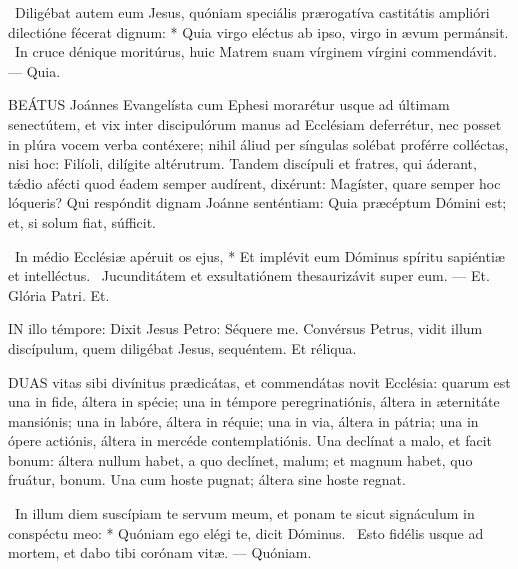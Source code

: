 \R\ Diligébat autem eum Jesus, quóniam speciális prærogatíva castitátis amplióri dilectióne fécerat dignum: * Quia virgo eléctus ab ipso, virgo in ævum permánsit. \V\ In cruce dénique moritúrus, huic Matrem suam vírginem vírgini commendávit. --- Quia.



\lettrine[lines=2]{B}{EÁTUS} Joánnes Evangelísta cum Ephesi morarétur usque ad últimam senectútem, et vix inter discipulórum manus ad Ecclésiam deferrétur, nec posset in plúra vocem verba contéxere; nihil áliud per síngulas solébat proférre colléctas, nisi hoc: Filíoli, dilígite altérutrum. Tandem discípuli et fratres, qui áderant, tǽdio afécti quod éadem semper audírent, dixérunt: Magíster, quare semper hoc lóqueris? Qui respóndit dignam Joánne senténtiam: Quia præcéptum Dómini est; et, si solum fiat, súfficit.

\R\ In médio Ecclésiæ apéruit os ejus, * Et implévit eum Dóminus spíritu sapiéntiæ et intelléctus. \V\ Jucunditátem et exsultatiónem thesaurizávit super eum. --- Et. Glória Patri. Et.




\lettrine[lines=2]{I}{N} illo témpore: Dixit Jesus Petro: Séquere me. Convérsus Petrus, vidit illum discípulum, quem diligébat Jesus, sequéntem. Et réliqua.



\lettrine[lines=2]{D}{UAS} vitas sibi divínitus prædicátas, et commendátas novit Ecclésia: quarum est una in fide, áltera in spécie; una in témpore peregrinatiónis, áltera in æternitáte mansiónis; una in labóre, áltera in réquie; una in via, áltera in pátria; una in ópere actiónis, áltera in mercéde contemplatiónis. Una declínat a malo, et facit bonum: áltera nullum habet, a quo declínet, malum; et magnum habet, quo fruátur, bonum. Una cum hoste pugnat; áltera sine hoste regnat.

\R\ In illum diem suscípiam te servum meum, et ponam te sicut signáculum in conspéctu meo: * Quóniam ego elégi te, dicit Dóminus. \V\ Esto fidélis usque ad mortem, et dabo tibi corónam vitæ. --- Quóniam.


